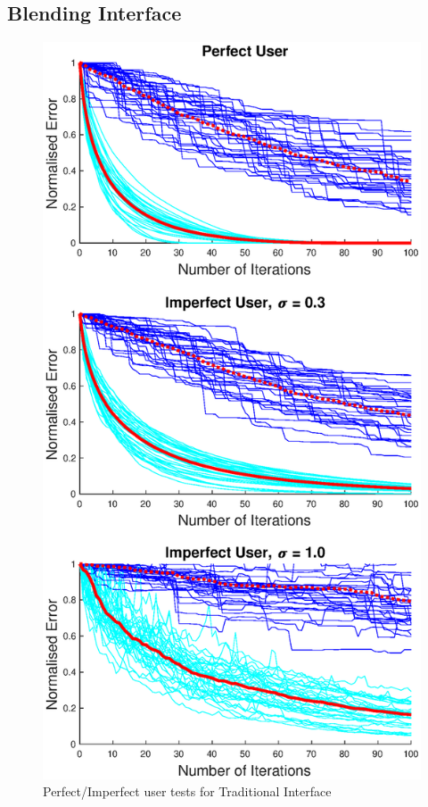 \documentclass[11pt, oneside]{report}   	%
\begin{document}
\subsection{Blending Interface}
\begin{figure}
	\centering
	\vspace{-100pt}
	\includegraphics[width = \textwidth/2]{TradInterfaceTests1.eps}
	\caption{Perfect/Imperfect user tests for Traditional Interface}
	\label{fig:TradTest1}
	
	
	\vspace{-140pt}
	
\end{figure}
\end{document}
